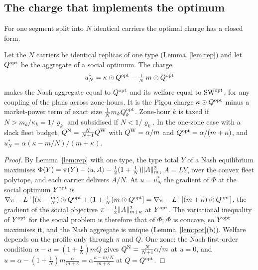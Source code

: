 \subsection{The charge that implements the optimum}\label{sec:ident}
For one segment split into $N$ identical carriers the optimal charge has a closed form.

\begin{proposition}\label{prop:marketpower}
Let the $N$ carriers be identical replicas of one type (Lemma~\ref{lem:rep}) and let $Q^{\mathrm{opt}}$ be the aggregate of a social optimum. The charge
\[
u^*_N=\kappa\odot Q^{\mathrm{opt}}-\tfrac1N\,m\odot Q^{\mathrm{opt}}
\]
makes the Nash aggregate equal to $Q^{\mathrm{opt}}$ and its welfare equal to $\mathrm{SW}^{\mathrm{opt}}$, for any coupling of the plans across zone-hours. It is the Pigou charge $\kappa\odot Q^{\mathrm{opt}}$ minus a market-power term of exact size $\tfrac1N m_kQ^{\mathrm{opt}}_k$. Zone-hour $k$ is taxed if $N>m_k/\kappa_k=1/\varrho_k$ and subsidised if $N<1/\varrho_k$. In the one-zone case with a slack fleet budget, $Q^{\mathrm{N}}=\frac N{N+1}Q^{\mathrm{W}}$ with $Q^{\mathrm{W}}=\alpha/m$ and $Q^{\mathrm{opt}}=\alpha/(m+\kappa)$, and $u_N^*=\alpha(\kappa-m/N)/(m+\kappa)$.
\end{proposition}
\begin{proof}
By Lemma~\ref{lem:rep} with one type, the type total $Y$ of a Nash equilibrium maximises $\Phi(Y)=\pi(Y)-\langle u,A\rangle-\tfrac12(1+\tfrac1N)\lVert A\rVert_m^2$, $A=LY$, over the convex fleet polytope, and each carrier delivers $A/N$. At $u=u_N^*$ the gradient of $\Phi$ at the social optimum $Y^{\mathrm{opt}}$ is $\nabla\pi-L^\top[(\kappa-\tfrac mN)\odot Q^{\mathrm{opt}}+(1+\tfrac1N)m\odot Q^{\mathrm{opt}}]=\nabla\pi-L^\top[(m+\kappa)\odot Q^{\mathrm{opt}}]$, the gradient of the social objective $\pi-\tfrac12\lVert A\rVert_{m+\kappa}^2$ at $Y^{\mathrm{opt}}$. The variational inequality of $Y^{\mathrm{opt}}$ for the social problem is therefore that of $\Phi$; $\Phi$ is concave, so $Y^{\mathrm{opt}}$ maximises it, and the Nash aggregate is unique (Lemma~\ref{lem:pot}(b)). Welfare depends on the profile only through $\pi$ and $Q$. One zone: the Nash first-order condition $\alpha-u=(1+\tfrac1N)mQ$ gives $Q^{\mathrm{N}}=\frac N{N+1}\alpha/m$ at $u=0$, and $u=\alpha-(1+\tfrac1N)m\frac{\alpha}{m+\kappa}=\alpha\frac{\kappa-m/N}{m+\kappa}$ at $Q=Q^{\mathrm{opt}}$.
\end{proof}

